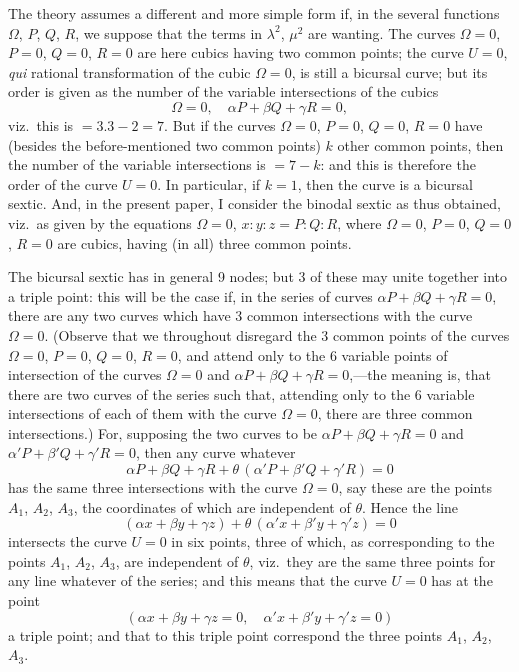 \documentclass[11pt,a4paper]{book}
\begin{document}
The theory assumes a different and more simple form if, in the several functions $\Omega$, $P$, $Q$, $R$, we suppose that the terms in $\lambda^2$, $\mu^2$ are wanting. The curves $\Omega=0$, $P=0$, $Q=0$, $R=0$ are here cubics having two common points; the curve $U=0$, \textit{qui} rational transformation of the cubic $\Omega=0$, is still a bicursal curve; but its order is given as the number of the variable intersections of the cubics
\[
\Omega = 0, \quad \alpha P + \beta Q + \gamma R = 0,
\]
viz.\ this is $= 3.3 - 2 = 7$. But if the curves $\Omega=0$, $P=0$, $Q=0$, $R=0$ have (besides the before-mentioned two common points) $k$ other common points, then the number of the variable intersections is $=7-k$: and this is therefore the order of the curve $U=0$. In particular, if $k=1$, then the curve is a bicursal sextic. And, in the present paper, I consider the binodal sextic as thus obtained, viz.\ as given by the equations $\Omega=0$, $x:y:z = P:Q:R$, where $\Omega=0$, $P=0$, $Q=0$, $R=0$ are cubics, having (in all) three common points.

The bicursal sextic has in general 9 nodes; but 3 of these may unite together into a triple point: this will be the case if, in the series of curves $\alpha P + \beta Q + \gamma R = 0$, there are any two curves which have 3 common intersections with the curve $\Omega=0$. (Observe that we throughout disregard the 3 common points of the curves $\Omega=0$, $P=0$, $Q=0$, $R=0$, and attend only to the 6 variable points of intersection of the curves $\Omega=0$ and $\alpha P+\beta Q+\gamma R=0$,---the meaning is, that there are two curves of the series such that, attending only to the 6 variable intersections of each of them with the curve $\Omega=0$, there are three common intersections.) For, supposing the two curves to be $\alpha P+\beta Q+\gamma R=0$ and $\alpha' P+\beta' Q+\gamma' R=0$, then any curve whatever
\[
\alpha P + \beta Q + \gamma R + \theta\, (\alpha' P + \beta' Q + \gamma' R) = 0
\]
has the same three intersections with the curve $\Omega=0$, say these are the points $A_1$, $A_2$, $A_3$, the coordinates of which are independent of $\theta$. Hence the line
\[
(\alpha x + \beta y + \gamma z) + \theta\, (\alpha' x + \beta' y + \gamma' z) = 0
\]
intersects the curve $U=0$ in six points, three of which, as corresponding to the points $A_1$, $A_2$, $A_3$, are independent of $\theta$, viz.\ they are the same three points for any line whatever of the series; and this means that the curve $U=0$ has at the point
\[
(\alpha x + \beta y + \gamma z = 0,\quad \alpha' x + \beta' y + \gamma' z = 0)
\]
a triple point; and that to this triple point correspond the three points $A_1$, $A_2$, $A_3$.
\end{document}
